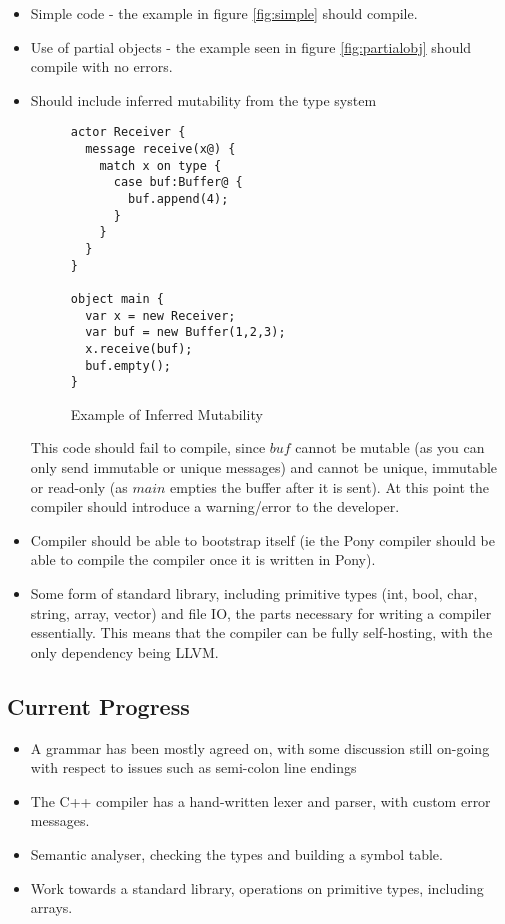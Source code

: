 \documentclass{article}
\begin{document}
\begin{itemize}

\item Simple code - the example in figure \ref{fig:simple} should compile.
\item Use of partial objects - the example seen in figure \ref{fig:partialobj}
      should compile
	  with no errors.

\item Should include inferred mutability from the type system

\begin{figure}[H]
\begin{verbatim}
actor Receiver {
  message receive(x@) {
    match x on type {
      case buf:Buffer@ {
        buf.append(4);
      }
    }
  }
}

object main {
  var x = new Receiver;
  var buf = new Buffer(1,2,3);
  x.receive(buf);
  buf.empty();
}
\end{verbatim}
\caption{Example of Inferred Mutability}
\end{figure}

This code should fail to compile, since $buf$ cannot be mutable (as you can only
send immutable or unique messages) and cannot be unique, immutable or read-only
(as $main$ empties the buffer after it is sent). At this point the compiler
should introduce a warning/error to the developer.

\item Compiler should be able to bootstrap itself (ie the Pony compiler should
be able to compile the compiler once it is written in Pony).

\item Some form of standard library, including primitive types (int, bool,
char, string, array, vector) and file IO, the parts necessary for writing a
compiler essentially. This means that the compiler can be fully self-hosting,
with the only dependency being LLVM.
\end{itemize}

\subsection{Current Progress}

\begin{itemize}
\item A grammar has been mostly agreed on, with some discussion still on-going
	with respect to issues such as semi-colon line endings
\item The C++ compiler has a hand-written lexer and parser, with custom error
	messages.
\item Semantic analyser, checking the types and building a symbol table.
\item Work towards a standard library, operations on primitive types, including
	arrays.
\end{itemize}
\end{document}
